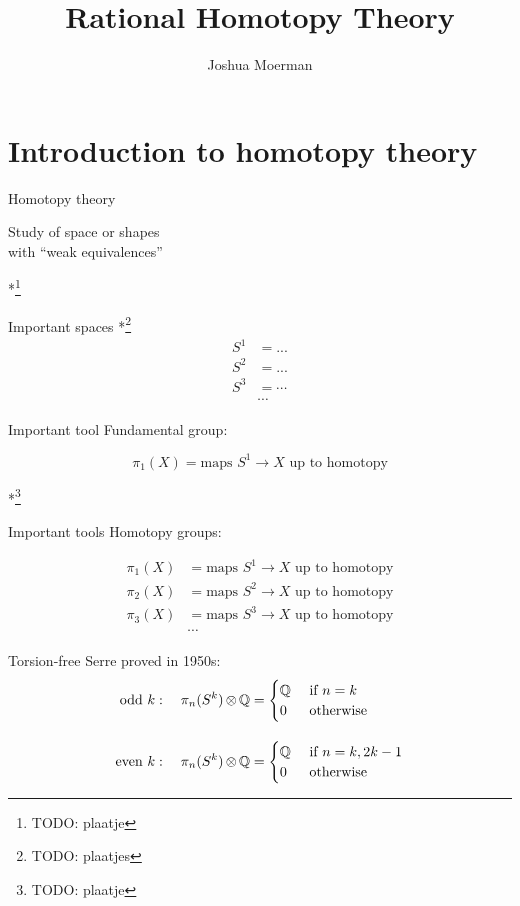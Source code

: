 \documentclass[14pt]{beamer}
\title{Rational Homotopy Theory}
\author{Joshua Moerman}
\institute[Radboud Universiteit Nijmegen]{Supervisor: Ieke Moerdijk}
\date{}
\newcommand{\td}[1]{\colorbox{todocolor}{*\footnote{TODO: #1}}}
\newcommand{\Frame}[2]{
	\begin{frame}{#1}#2\end{frame}
}
\begin{document}

\Frame{}{
	\titlepage
}


\section{Introduction to homotopy theory}
\Frame{Homotopy theory}{
	\begin{center}
	Study of space or shapes \\
	with ``weak equivalences''

	\bigskip
	\td{plaatje}
	\end{center}
}

\Frame{Important spaces}{
\td{plaatjes}
\begin{align*}
	S^1 &= ... \\[1em]
	S^2 &= ... \\[1em]
	S^3 &= \cdots \\[1em]
	    &\cdots
\end{align*}
}

\Frame{Important tool}{
	Fundamental group:

	\[ \pi_1(X) = \text{maps } S^1 \to X \text{ up to homotopy} \]

	\bigskip
	\td{plaatje}
}

\Frame{Important tools}{
	Homotopy groups:

	\begin{align*}
	\pi_1(X) &= \text{maps } S^1 \to X \text{ up to homotopy} \\[1em]
	\pi_2(X) &= \text{maps } S^2 \to X \text{ up to homotopy} \\[1em]
	\pi_3(X) &= \text{maps } S^3 \to X \text{ up to homotopy} \\[1em]
	&\cdots
	\end{align*}
}

\Frame{Torsion-free}{
	Serre proved in 1950s:
	\begin{align*}
		\text{odd } k: \quad \pi_n(S^k) \operatorname*{\otimes} \mathbb{Q} &=
		\begin{cases}
			\mathbb{Q} &\text{ if } n = k \\
			0 &\text{ otherwise }
		\end{cases} \\[1em]
		\text{even } k: \quad \pi_n(S^k) \operatorname*{\otimes} \mathbb{Q} &=
		\begin{cases}
			\mathbb{Q} &\text{ if } n = k, 2k-1 \\
			0 &\text{ otherwise }
		\end{cases} \\
	\end{align*}
}
\end{document}
